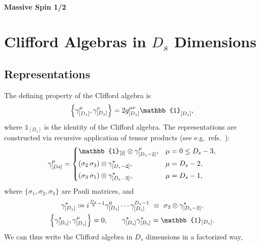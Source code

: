 \subsubsection{Massive Spin 1/2}






\chapter{Clifford Algebras in $D_s$ Dimensions}
\label{sec:clifford_algebra_ds}

\section{Representations}
The defining property of the Clifford algebra is
\begin{equation} \label{eqn:defClifford}
\acomm{\gamma_{[D_s]}^\mu}{\gamma_{[D_s]}^\nu} = 2 g_{[D_s]}^{\mu\nu}\mathbb{1}_{[D_s]}^{\vphantom{\mu\nu}},
\end{equation}
where $\mathbb{1}_{[D_s]}$ is the identity of the Clifford algebra.
The representations are constructed via recursive application of tensor products (see e.g.\ refs.~\cite{Collins:1984xc,Kreuzer:susylectures}):
\begin{align}\label{eq:gammait}
  \gamma^\mu_{[Ds]}  = 
  \begin{dcases}
    \mathbb{1}_{[2]} \otimes \gamma^\mu_{[D_s-2]}, & \mu =0\leq D_s-3,\\
    (\sigma_2\,\sigma_3) \otimes \gamma^\star_{[D_s-2]}, & \mu = D_s-2,\\
    (\sigma_3\,\sigma_1) \otimes \gamma^\star_{[D_s-2]}, & \mu = D_s-1,\\
  \end{dcases}
\end{align}
where $\{\sigma_1,\sigma_2,\sigma_3\}$ are Pauli matrices, and
\begin{equation}
  \begin{gathered}
    \gamma^\star_{[D_s]} \coloneqq i^{\frac{D_s}{2}-1} \gamma^0_{[D_s]}\cdots{}\gamma^{D_s -1 }_{[D_s]} ~\equiv~ \sigma_3 \otimes \gamma^\star_{[D_s-2]}, \\
    \acomm{\gamma^\star_{[D_s]}}{\gamma^\mu_{[D_s]}}=0, \qquad \gamma^\star_{[D_s]} \gamma^\star_{[D_s]} = \mathbb{1}_{[D_s]}.
  \end{gathered}
\end{equation}
We can thus write the Clifford algebra in $D_s$ dimensions in a factorized way,
